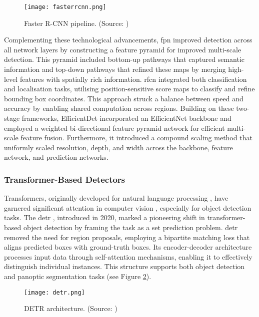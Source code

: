 \begin{figure}[ht]
    \centering
    \texttt{[image: fasterrcnn.png]}
    \caption{Faster R-CNN pipeline. (Source: \cite{fasterrcnn})}
    \label{fig:fasterrcnn}
\end{figure}

Complementing these technological advancements, \gls{fpn} \cite{fpn} improved detection across all network layers by constructing a feature pyramid for improved multi-scale detection. This pyramid included bottom-up pathways that captured semantic information and top-down pathways that refined these maps by merging high-level features with spatially rich information. \gls{rfcn} \cite{rfcn} integrated both classification and localisation tasks, utilising position-sensitive score maps to classify and refine bounding box coordinates. This approach struck a balance between speed and accuracy by enabling shared computation across regions.
Building on these two-stage frameworks, EfficientDet \cite{efficientdet} incorporated an EfficientNet \cite{efficientnet} backbone and employed a weighted bi-directional feature pyramid network for efficient multi-scale feature fusion. Furthermore, it introduced a compound scaling method that uniformly scaled resolution, depth, and width across the backbone, feature network, and prediction networks.

\subsubsection{Transformer-Based Detectors}
\label{subsubsec:2_transformers}

Transformers, originally developed for natural language processing \cite{transformers}, have garnered significant attention in computer vision \cite{visiontransformer}, especially for object detection tasks. The \gls{detr} \cite{detr}, introduced in 2020, marked a pioneering shift in transformer-based object detection by framing the task as a set prediction problem. \gls{detr} removed the need for region proposals, employing a bipartite matching loss that aligns predicted boxes with ground-truth boxes. Its encoder-decoder architecture processes input data through self-attention mechanisms, enabling it to effectively distinguish individual instances. This structure supports both object detection and panoptic segmentation tasks (see Figure \ref{fig:detr}).

\begin{figure}[ht]
    \centering
    \texttt{[image: detr.png]}
    \caption{DETR architecture. (Source: \cite{detr})}
    \label{fig:detr}
\end{figure}

